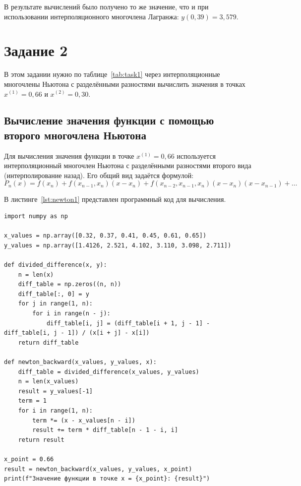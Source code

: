 \documentclass[a4paper, final]{article}
\begin{document}
В результате вычислений было получено то же значение, что и при использовании интерполяционного многочлена Лагранжа: \(y(0{,}39) = 3{,}579\).

\newpage

\section{Задание 2}

В этом задании нужно по таблице~\ref{tab:task1} через интерполяционные многочлены Ньютона с разделёнными разностями вычислить значения в точках $x^{(1)} = 0{,}66$ и $x^{(2)} = 0{,}30$.

\subsection{Вычисление значения функции с помощью второго многочлена Ньютона}

Для вычисления значения функции в точке \(x^{(1)} = 0{,}66\) используется интерполяционный многочлен Ньютона с разделёнными разностями второго вида (интерполирование назад). Его общий вид задаётся формулой:
\[
P_n(x) = f(x_n) + f(x_{n-1}, x_n)(x - x_n) + f(x_{n-2}, x_{n-1}, x_n)(x - x_n)(x - x_{n-1}) + \dots
\]

В листинге~\ref{lst:newton1} представлен программный код для вычисления.

\begin{lstlisting}[caption={Вычисление значения функции с помощью второго многочлена Ньютона}, label=lst:newton1]
import numpy as np

x_values = np.array([0.32, 0.37, 0.41, 0.45, 0.61, 0.65])
y_values = np.array([1.4126, 2.521, 4.102, 3.110, 3.098, 2.711])

def divided_difference(x, y):
    n = len(x)
    diff_table = np.zeros((n, n))
    diff_table[:, 0] = y
    for j in range(1, n):
        for i in range(n - j):
            diff_table[i, j] = (diff_table[i + 1, j - 1] - diff_table[i, j - 1]) / (x[i + j] - x[i])
    return diff_table

def newton_backward(x_values, y_values, x):
    diff_table = divided_difference(x_values, y_values)
    n = len(x_values)
    result = y_values[-1]
    term = 1
    for i in range(1, n):
        term *= (x - x_values[n - i])
        result += term * diff_table[n - 1 - i, i]
    return result

x_point = 0.66
result = newton_backward(x_values, y_values, x_point)
print(f"Значение функции в точке x = {x_point}: {result}")
\end{lstlisting}
\end{document}
